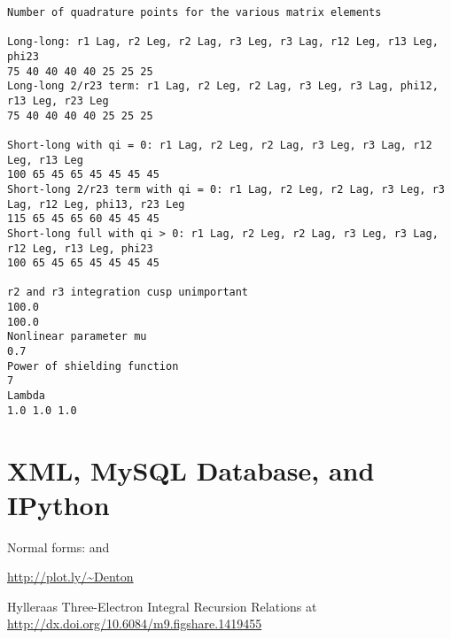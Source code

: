 \documentclass[Dissertation.tex]{subfiles}
\begin{document}





{
\singlespacing

\begin{lstlisting}[caption=Set of integration points in m07n7.txt]
Number of quadrature points for the various matrix elements

Long-long: r1 Lag, r2 Leg, r2 Lag, r3 Leg, r3 Lag, r12 Leg, r13 Leg, phi23
75 40 40 40 40 25 25 25
Long-long 2/r23 term: r1 Lag, r2 Leg, r2 Lag, r3 Leg, r3 Lag, phi12, r13 Leg, r23 Leg
75 40 40 40 40 25 25 25

Short-long with qi = 0: r1 Lag, r2 Leg, r2 Lag, r3 Leg, r3 Lag, r12 Leg, r13 Leg
100 65 45 65 45 45 45 45
Short-long 2/r23 term with qi = 0: r1 Lag, r2 Leg, r2 Lag, r3 Leg, r3 Lag, r12 Leg, phi13, r23 Leg
115 65 45 65 60 45 45 45
Short-long full with qi > 0: r1 Lag, r2 Leg, r2 Lag, r3 Leg, r3 Lag, r12 Leg, r13 Leg, phi23
100 65 45 65 45 45 45 45

r2 and r3 integration cusp unimportant
100.0
100.0
Nonlinear parameter mu
0.7
Power of shielding function
7
Lambda
1.0 1.0 1.0
\end{lstlisting}

}



\section{XML, MySQL Database, and IPython}
\label{sec:XMLSQLIPy}


Normal forms:
\cite{Phlonx} and \cite{Kent1983}


\url{http://plot.ly/~Denton}



Hylleraas Three-Electron Integral Recursion Relations at \url{http://dx.doi.org/10.6084/m9.figshare.1419455}
\end{document}
